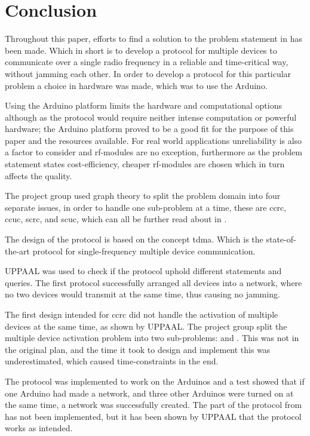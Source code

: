 \chapter{Conclusion}\label{cha:conclusion}
Throughout this paper, efforts to find a solution to the problem statement in  has been made.
Which in short is to develop a protocol for multiple devices to communicate over a single radio frequency in a reliable and time-critical way, without jamming each other.
In order to develop a protocol for this particular problem a choice in hardware was made, which was to use the Arduino.

Using the Arduino platform limits the hardware and computational options although as the protocol would require neither intense computation or powerful hardware; the Arduino platform proved to be a good fit for the purpose of this paper and the resources available.
For real world applications unreliability is also a factor to consider and \gls{rf}-modules are no exception, furthermore as the problem statement states cost-efficiency, cheaper \gls{rf}-modules are chosen which in turn affects the quality.

\bigskip \noindent
The project group used graph theory to split the problem domain into four separate issues, in order to handle one sub-problem at a time, these are \acrfull{ccrc}, \acrfull{ccuc}, \acrfull{scrc}, and \acrfull{scuc}, which can all be further read about in .

The design of the protocol is based on the concept \acrfull{tdma}.
Which is the state-of-the-art protocol for single-frequency multiple device communication.

UPPAAL was used to check if the protocol uphold different statements and queries.
The first protocol successfully arranged all devices into a network, where no two devices would transmit at the same time, thus causing no jamming.

The first design intended for \acrshort{ccrc} did not handle the activation of multiple devices at the same time, as shown by UPPAAL.
The project group split the multiple device activation problem into two sub-problems:  and .
This was not in the original plan, and the time it took to design and implement this was underestimated, which caused time-constraints in the end.

The protocol was implemented to work on the Arduinos and a test showed that if one Arduino had made a network, and three other Arduinos were turned on at the same time, a network was successfully created.
The part of the protocol from  has not been implemented, but it has been shown by UPPAAL that the protocol works as intended.

